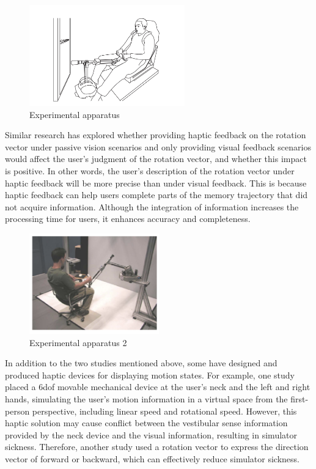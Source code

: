 \begin{figure}[h]
\centering
\includegraphics[width=0.6\textwidth]{A_thesis/figures/005.png}
\caption{Experimental apparatus}
\end{figure}


\newpage
Similar research\cite{ref_motion002} has explored whether providing haptic feedback on the rotation vector under passive vision scenarios and only providing visual feedback scenarios would affect the user's judgment of the rotation vector, and whether this impact is positive. In other words, the user's description of the rotation vector under haptic feedback will be more precise than under visual feedback. This is because haptic feedback can help users complete parts of the memory trajectory that did not acquire information. Although the integration of information increases the processing time for users, it enhances accuracy and completeness.

\begin{figure}[h]
\centering
\includegraphics[width=0.5\textwidth]{A_thesis/figures/006.png}
\caption{Experimental apparatus 2}
\end{figure}

\newpage
In addition to the two studies mentioned above, some have designed and produced haptic devices for displaying motion states. For example, one study\cite{ref_motion003} placed a 6dof movable mechanical device at the user's neck and the left and right hands, simulating the user's motion information in a virtual space from the first-person perspective, including linear speed and rotational speed. However, this haptic solution may cause conflict between the vestibular sense information provided by the neck device and the visual information, resulting in simulator sickness. Therefore, another study\cite{ref_motion004} used a rotation vector to express the direction vector of forward or backward, which can effectively reduce simulator sickness.

